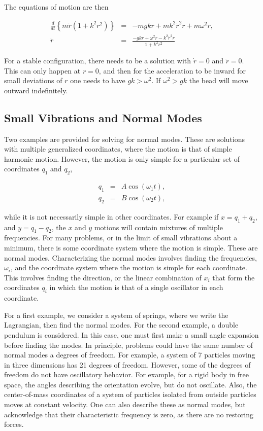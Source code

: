 \documentclass[%
oneside,                 %
final,                   %
10pt]{article}
\begin{document}
The equations of motion are then

\begin{eqnarray*}
\frac{d}{dt}\left\{m\dot{r}(1+k^2r^2)\right\}&=&-mgkr+mk^2\dot{r}^2r+m\omega^2r,\\
\ddot{r}&=&\frac{-gkr+\omega^2r-k^2\dot{r}^2r}{1+k^2r^2}
\end{eqnarray*}

For a stable configuration, there needs to be a solution with
$\dot{r}=0$ and $\ddot{r}=0$. This can only happen at $r=0$, and then
for the acceleration to be inward for small deviations of $r$ one
needs to have $gk>\omega^2$. If $\omega^2>gk$ the bead will move
outward indefinitely.

\subsection{Small Vibrations and Normal Modes}

Two examples are provided for solving for normal modes. These are
solutions with multiple generalized coordinates, where the motion is
that of simple harmonic motion. However, the motion is only simple for
a particular set of coordinates $q_1$ and $q_2$,

\begin{eqnarray}
q_1&=&A\cos(\omega_1 t),\\
\nonumber
q_2&=&B\cos(\omega_2 t),
\end{eqnarray}

while it is not necessarily simple in other coordinates. For example
if $x=q_1+q_2$, and $y=q_1-q_2$, the $x$ and $y$ motions will contain
mixtures of multiple frequencies. For many problems, or in the limit
of small vibrations about a minimum, there is some coordinate system
where the motion is simple. These are normal modes. Characterizing the
normal modes involves finding the frequencies, $\omega_i$, and the
coordinate system where the motion is simple for each coordinate. This
involves finding the direction, or the linear combination of $x_i$
that form the coordinates $q_i$ in which the motion is that of a
single oscillator in each coordinate.

For a first example, we consider a system of springs, where we write
the Lagrangian, then find the normal modes. For the second example, a
double pendulum is considered. In this case, one must first make a
small angle expansion before finding the modes. In principle, problems
could have the same number of normal modes a degrees of freedom. For
example, a system of 7 particles moving in three dimensions has 21
degrees of freedom. However, some of the degrees of freedom do not
have oscillatory behavior. For example, for a rigid body in free
space, the angles describing the orientation evolve, but do not
oscillate. Also, the center-of-mass coordinates of a system of
particles isolated from outside particles moves at constant
velocity. One can also describe these as normal modes, but acknowledge
that their characteristic frequency is zero, as there are no restoring
forces.
\end{document}
